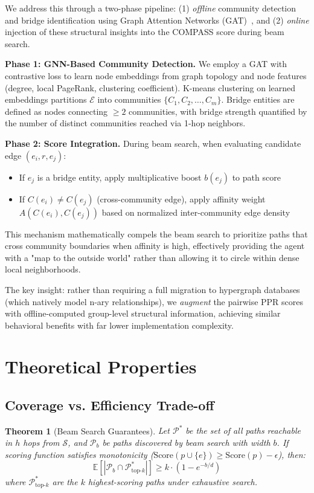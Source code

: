 \documentclass[10pt,twocolumn]{article}
\newtheorem{theorem}{Theorem}
\begin{document}
We address this through a two-phase pipeline: (1) \textit{offline} community detection and bridge identification using Graph Attention Networks (GAT)~\cite{velickovic2017graph}, and (2) \textit{online} injection of these structural insights into the COMPASS score during beam search.

\textbf{Phase 1: GNN-Based Community Detection.} We employ a GAT with contrastive loss to learn node embeddings from graph topology and node features (degree, local PageRank, clustering coefficient). K-means clustering on learned embeddings partitions $\mathcal{E}$ into communities $\{C_1, C_2, \ldots, C_m\}$. Bridge entities are defined as nodes connecting $\geq 2$ communities, with bridge strength quantified by the number of distinct communities reached via 1-hop neighbors.

\textbf{Phase 2: Score Integration.} During beam search, when evaluating candidate edge $(e_i, r, e_j)$:
\begin{itemize}
\item If $e_j$ is a bridge entity, apply multiplicative boost $b(e_j)$ to path score
\item If $C(e_i) \neq C(e_j)$ (cross-community edge), apply affinity weight $A(C(e_i), C(e_j))$ based on normalized inter-community edge density
\end{itemize}

This mechanism mathematically compels the beam search to prioritize paths that cross community boundaries when affinity is high, effectively providing the agent with a "map to the outside world" rather than allowing it to circle within dense local neighborhoods.

The key insight: rather than requiring a full migration to hypergraph databases (which natively model n-ary relationships), we \textit{augment} the pairwise PPR scores with offline-computed group-level structural information, achieving similar behavioral benefits with far lower implementation complexity.

\section{Theoretical Properties}

\subsection{Coverage vs. Efficiency Trade-off}

\begin{theorem}[Beam Search Guarantees]
Let $\mathcal{P}^*$ be the set of all paths reachable in $h$ hops from $\mathcal{S}$, and $\mathcal{P}_b$ be paths discovered by beam search with width $b$. If scoring function satisfies monotonicity ($\text{Score}(p \cup \{e\}) \geq \text{Score}(p) - \epsilon$), then:
\begin{equation}
\mathbb{E}[|\mathcal{P}_b \cap \mathcal{P}^*_{\text{top-}k}|] \geq k \cdot (1 - e^{-b/d})
\end{equation}
where $\mathcal{P}^*_{\text{top-}k}$ are the $k$ highest-scoring paths under exhaustive search.
\end{theorem}
\end{document}
